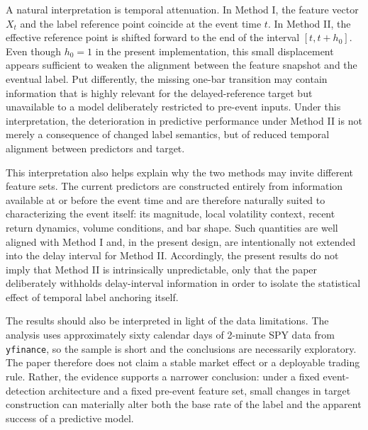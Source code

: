 \documentclass[11pt,a4paper]{article}
\begin{document}
		A natural interpretation is temporal attenuation. In Method I, the feature vector \(X_t\) and the label reference point coincide at the event time \(t\). In Method II, the effective reference point is shifted forward to the end of the interval \([t,t+h_0]\). Even though \(h_0=1\) in the present implementation, this small displacement appears sufficient to weaken the alignment between the feature snapshot and the eventual label. Put differently, the missing one-bar transition may contain information that is highly relevant for the delayed-reference target but unavailable to a model deliberately restricted to pre-event inputs. Under this interpretation, the deterioration in predictive performance under Method II is not merely a consequence of changed label semantics, but of reduced temporal alignment between predictors and target.

		This interpretation also helps explain why the two methods may invite different feature sets. The current predictors are constructed entirely from information available at or before the event time and are therefore naturally suited to characterizing the event itself: its magnitude, local volatility context, recent return dynamics, volume conditions, and bar shape. Such quantities are well aligned with Method I and, in the present design, are intentionally not extended into the delay interval for Method II. Accordingly, the present results do not imply that Method II is intrinsically unpredictable, only that the paper deliberately withholds delay-interval information in order to isolate the statistical effect of temporal label anchoring itself.

		The results should also be interpreted in light of the data limitations. The analysis uses approximately sixty calendar days of 2-minute SPY data from \texttt{yfinance}, so the sample is short and the conclusions are necessarily exploratory. The paper therefore does not claim a stable market effect or a deployable trading rule. Rather, the evidence supports a narrower conclusion: under a fixed event-detection architecture and a fixed pre-event feature set, small changes in target construction can materially alter both the base rate of the label and the apparent success of a predictive model.
\end{document}
